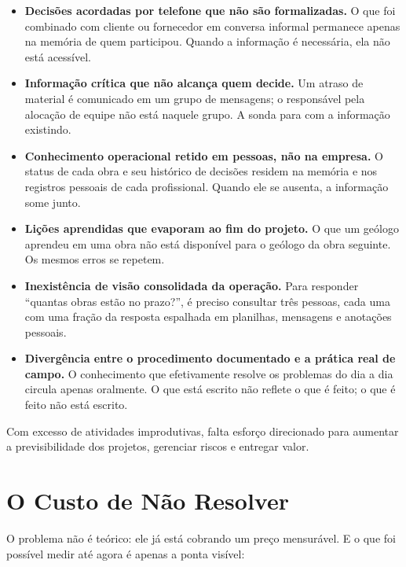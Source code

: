 \documentclass[12pt,a4paper]{scrartcl}
\begin{document}
\begin{itemize}
  \item \textbf{Decisões acordadas por telefone que não são formalizadas.} O que foi combinado com cliente ou fornecedor em conversa informal permanece apenas na memória de quem participou. Quando a informação é necessária, ela não está acessível.
  \item \textbf{Informação crítica que não alcança quem decide.} Um atraso de material é comunicado em um grupo de mensagens; o responsável pela alocação de equipe não está naquele grupo. A sonda para com a informação existindo.
  \item \textbf{Conhecimento operacional retido em pessoas, não na empresa.} O status de cada obra e seu histórico de decisões residem na memória e nos registros pessoais de cada profissional. Quando ele se ausenta, a informação some junto.
  \item \textbf{Lições aprendidas que evaporam ao fim do projeto.} O que um geólogo aprendeu em uma obra não está disponível para o geólogo da obra seguinte. Os mesmos erros se repetem.
  \item \textbf{Inexistência de visão consolidada da operação.} Para responder ``quantas obras estão no prazo?'', é preciso consultar três pessoas, cada uma com uma fração da resposta espalhada em planilhas, mensagens e anotações pessoais.
  \item \textbf{Divergência entre o procedimento documentado e a prática real de campo.} O conhecimento que efetivamente resolve os problemas do dia a dia circula apenas oralmente. O que está escrito não reflete o que é feito; o que é feito não está escrito.
\end{itemize}

Com excesso de atividades improdutivas, falta esforço direcionado para aumentar a previsibilidade dos projetos, gerenciar riscos e entregar valor.

\section{O Custo de Não Resolver}

O problema não é teórico: ele já está cobrando um preço mensurável. E o que foi possível medir até agora é apenas a ponta visível:
\end{document}
